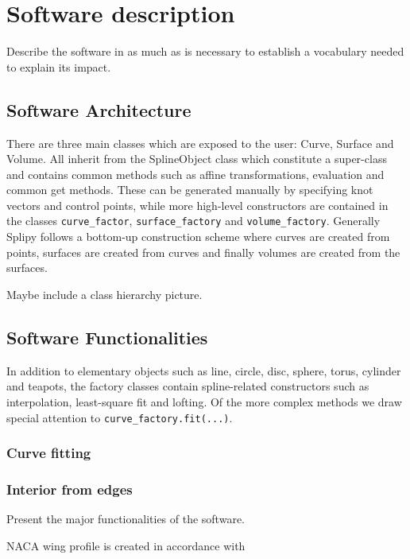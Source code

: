 \documentclass[preprint,12pt, a4paper]{elsarticle}
\begin{document}
\section{Software description}
\label{}

Describe the software in as much as is necessary to establish a vocabulary needed to explain its impact. 

\subsection{Software Architecture}
\label{}

There are three main classes which are exposed to the user: Curve, Surface and Volume.
All inherit from the SplineObject class which constitute a super-class and contains common methods such as affine transformations, evaluation and common get methods.
These can be generated manually by specifying knot vectors and control points, while more high-level constructors are contained in the classes \texttt{curve\_factor}, \texttt{surface\_factory} and \texttt{volume\_factory}.
Generally Splipy follows a bottom-up construction scheme where curves are created from points, surfaces are created from curves and finally volumes are created from the surfaces.

Maybe include a class hierarchy picture.

\subsection{Software Functionalities}
\label{}

In addition to elementary objects such as line, circle, disc, sphere, torus, cylinder and teapots, the factory classes contain spline-related constructors such as interpolation, least-square fit and lofting.
Of the more complex methods we draw special attention to \texttt{curve\_factory.fit(...)}.

\subsubsection{Curve fitting}
\label{}

\subsubsection{Interior from edges}
\label{}

Present the major functionalities of the software.

NACA wing profile is created in accordance with \cite{abbott1959tow}
\end{document}
